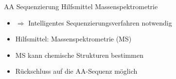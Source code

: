\documentclass{beamer}
\newcommand{\dashAndSpace}{\textendash \space}
\begin{document}
         \begin{frame}{AA Sequenzierung \dashAndSpace Hilfsmittel Massenspektrometrie}
         \begin{itemize}
          \item<1-> $\Rightarrow$ Intelligentes Sequenzierungsverfahren notwendig
         \end{itemize}
        \begin{itemize}
        \item<2-> Hilfsmittel: Massenspektrometrie (MS)
        \item<2-> MS kann chemische Strukturen bestimmen
        \item<2-> Rückschluss auf die AA-Sequenz möglich
        \end{itemize}
         \end{frame}
\end{document}
